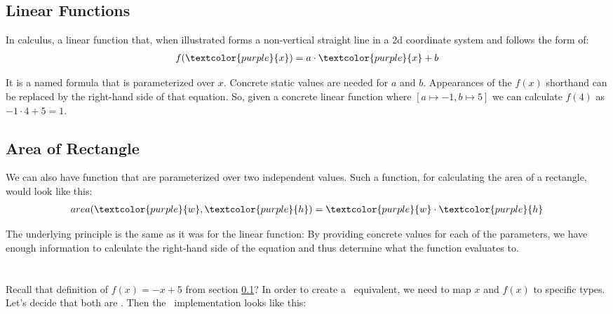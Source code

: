 \subsection{Linear Functions}
\label{sec:func:linear}

In calculus, a linear function that, when illustrated forms a non-vertical straight line in a 2d coordinate system and follows the form of:
\begin{eqnarray*}
  f(\textcolor{purple}{x}) = a \cdot \textcolor{purple}{x} + b
\end{eqnarray*}

It is a named formula that is parameterized over $x$. Concrete static values are needed for $a$ and $b$. Appearances of the $f(x)$ shorthand can be replaced by the right-hand side of that equation. So, given a concrete linear function where $[ a \mapsto -1 , b \mapsto 5 ]$ we can calculate $f(4)$ as $-1 \cdot 4 + 5 = 1$.

\subsection{Area of Rectangle}
\label{sec:func:area}

We can also have function that are parameterized over two independent values. Such a function, for calculating the area of a rectangle, would look like this:
\begin{eqnarray*}
  area(\textcolor{purple}{w}, \textcolor{purple}{h}) = \textcolor{purple}{w} \cdot \textcolor{purple}{h}
\end{eqnarray*}

The underlying principle is the same as it was for the linear function: By providing concrete values for each of the parameters, we have enough information to calculate the right-hand side of the equation and thus determine what the function evaluates to.

\section{\csharp}

Recall that definition of $f(x) = -x+5$ from section \ref{sec:func:linear}? In order to create a \csharp\ equivalent, we need to map $x$ and $f(x)$ to specific types. Let's decide that both are . Then the \csharp\ implementation looks like this:

